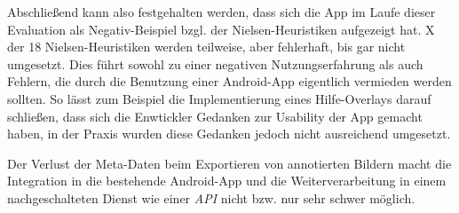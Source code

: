 Abschließend kann also festgehalten werden, dass sich die App im Laufe dieser Evaluation als Negativ-Beispiel bzgl. der Nielsen-Heuristiken aufgezeigt hat.
 X der 18 Nielsen-Heuristiken werden teilweise, aber fehlerhaft, bis gar nicht umgesetzt. 
Dies führt sowohl zu einer negativen Nutzungserfahrung als auch Fehlern, die durch die Benutzung einer Android-App eigentlich vermieden werden sollten.
So lässt zum Beispiel die Implementierung eines Hilfe-Overlays darauf schließen, dass sich die Enwtickler Gedanken zur Usability der App gemacht haben, in der Praxis wurden diese Gedanken jedoch nicht ausreichend umgesetzt.

Der Verlust der Meta-Daten beim Exportieren von annotierten Bildern macht die Integration in die bestehende Android-App und die Weiterverarbeitung in einem nachgeschalteten Dienst wie einer \emph{API} nicht bzw. nur sehr schwer möglich.

